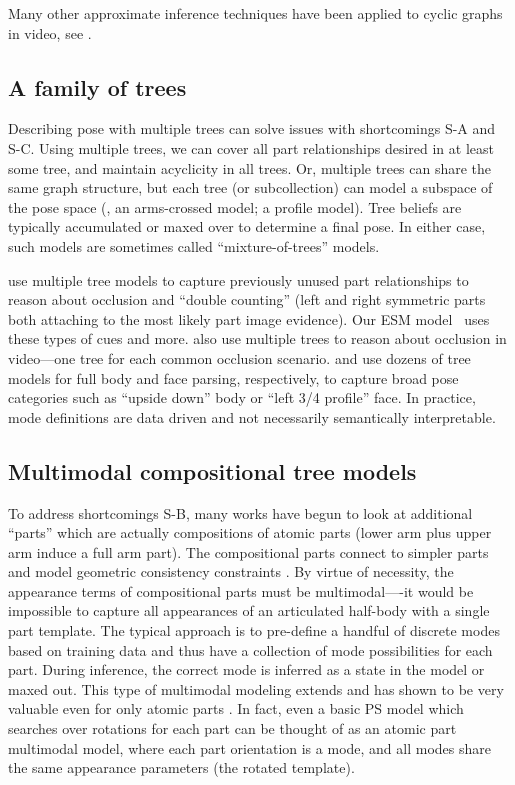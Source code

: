 Many other approximate inference techniques have been applied to cyclic graphs 
in video, see .

\subsection{A family of trees}\label{sec:tree-fam}
Describing pose with multiple trees can solve issues with shortcomings S-A and 
S-C.   Using multiple trees, we can cover all part relationships desired in at 
least some tree, and maintain acyclicity in all trees.  Or, multiple trees can 
share the same graph structure, but each tree (or subcollection) can model a 
subspace of the pose space (\eg, an arms-crossed model; a profile model). Tree 
beliefs are typically accumulated or maxed over to determine a final pose.  In 
either case, such models are sometimes called ``mixture-of-trees'' models.
  
\citet{wang2008multiple} use multiple tree models to capture previously unused 
part relationships to reason about occlusion and ``double counting'' (left and 
right symmetric parts both attaching to the most likely part image evidence).  
Our ESM model~ uses these types of cues and more.  
\citet{ioffe2001} also use multiple trees to reason about occlusion in 
video---one tree for each common occlusion scenario.  \citet{everingham2011} 
and \citet{ramanan-faces} use dozens of tree models for full body and face 
parsing, respectively, to capture broad pose categories such as ``upside down'' 
body or ``left 3/4 profile'' face.  In practice, mode definitions are data 
driven and not necessarily semantically interpretable.

\subsection{Multimodal compositional tree models}
To address shortcomings S-B, many works have begun to look at additional 
``parts'' which are actually compositions of atomic parts (\eg lower arm plus 
upper arm induce a full arm part).  The compositional parts connect to simpler 
parts and model geometric consistency constraints 
\citep{wang2011,sun2011,deva2011}.  By virtue of necessity, the appearance 
terms of compositional parts must be multimodal----it would be impossible to 
capture all appearances of an articulated half-body with a single part 
template.  The typical approach is to pre-define a handful of discrete modes 
based on training data and thus have a collection of mode possibilities for 
each part. During inference, the correct mode is inferred as a state in the 
model or maxed out.  This type of multimodal modeling extends and has shown to 
be very valuable even for only atomic parts \citep{deva2011}.  In fact, even a 
basic PS model which searches over rotations for each part can be thought of as 
an atomic part multimodal model, where each part orientation is a mode, and all 
modes share the same appearance parameters (the rotated template).

